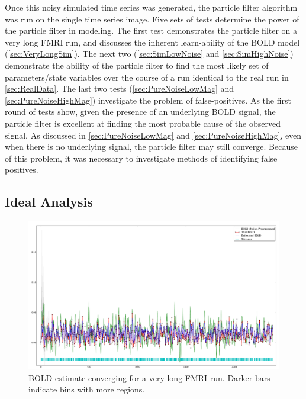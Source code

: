 Once this noisy simulated time series was generated, the particle filter algorithm
was run on the single time series image. Five sets of tests 
determine the power of the particle filter in modeling. 
The first test demonstrates the particle filter on a very long FMRI
run, and discusses the inherent learn-ability of the BOLD model 
(\autoref{sec:VeryLongSim}). 
The next two (\autoref{sec:SimLowNoise} and \autoref{sec:SimHighNoise}) 
demonstrate the ability of the particle filter to find the most likely
set of parameters/state variables over the course of a run identical to the
real run in \autoref{sec:RealData}. The last two 
tests (\autoref{sec:PureNoiseLowMag} and \autoref{sec:PureNoiseHighMag}) 
investigate the problem of false-positives. As the first
round of tests show, given the presence of an underlying BOLD signal, 
the particle filter is excellent at finding the most probable cause of 
the observed signal. As discussed in \autoref{sec:PureNoiseLowMag} and 
\autoref{sec:PureNoiseHighMag}, even when there is no underlying signal, 
the particle filter may still converge. Because of this problem, it was 
necessary to investigate methods of identifying false positives.

\subsection{Ideal Analysis}
\label{sec:VeryLongSim}

\begin{figure}
\centering
\includegraphics[clip=true,trim=1cm 0cm 0cm 0cm, width=17cm]{images/long_converge}
\caption{BOLD estimate converging for a very long FMRI run. Darker bars indicate
bins with more regions. }
\label{fig:long_converge}
\end{figure}

